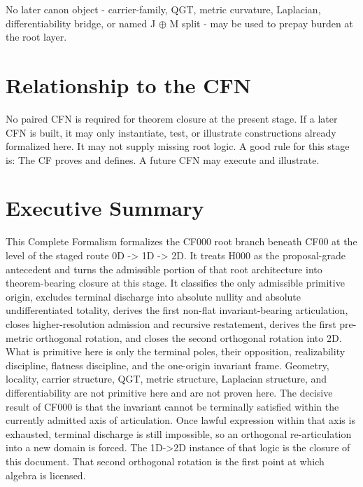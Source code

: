 \documentclass[11pt]{article}
\begin{document}
No later canon object - carrier-family, QGT, metric curvature, Laplacian, differentiability bridge, or named J $\oplus$ M split - may be used to prepay burden at the root layer.

\section{Relationship to the CFN}\label{relationship-to-the-cfn}

No paired CFN is required for theorem closure at the present stage. If a later CFN is built, it may only instantiate, test, or illustrate constructions already formalized here. It may not supply missing root logic. A good rule for this stage is: The CF proves and defines. A future CFN may execute and illustrate.

\section{Executive Summary}\label{executive-summary}

This Complete Formalism formalizes the CF000 root branch beneath CF00 at the level of the staged route 0D -\textgreater{} 1D -\textgreater{} 2D. It treats H000 as the proposal-grade antecedent and turns the admissible portion of that root architecture into theorem-bearing closure at this stage. It classifies the only admissible primitive origin, excludes terminal discharge into absolute nullity and absolute undifferentiated totality, derives the first non-flat invariant-bearing articulation, closes higher-resolution admission and recursive restatement, derives the first pre-metric orthogonal rotation, and closes the second orthogonal rotation into 2D. What is primitive here is only the terminal poles, their opposition, realizability discipline, flatness discipline, and the one-origin invariant frame. Geometry, locality, carrier structure, QGT, metric structure, Laplacian structure, and differentiability are not primitive here and are not proven here. The decisive result of CF000 is that the invariant cannot be terminally satisfied within the currently admitted axis of articulation. Once lawful expression within that axis is exhausted, terminal discharge is still impossible, so an orthogonal re-articulation into a new domain is forced. The 1D-\textgreater2D instance of that logic is the closure of this document. That second orthogonal rotation is the first point at which algebra is licensed.
\end{document}
